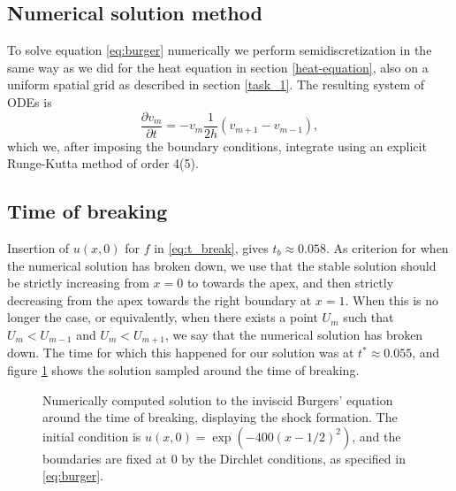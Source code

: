 \subsection*{Numerical solution method}
To solve equation \eqref{eq:burger} numerically we perform semidiscretization in the same way as we did for the heat equation in section \ref{heat-equation}, 
also on a uniform spatial grid as described in section \ref{task_1}. 
The resulting system of ODEs is
\begin{equation*}
    \frac{\partial v_m}{\partial t} = -v_m \frac{1}{2h} (v_{m+1} - v_{m-1}), 
\end{equation*}
which we, after imposing the boundary conditions, 
integrate using an explicit Runge-Kutta method of order 4(5). 

%    

\subsection{Time of breaking}
Insertion of $u(x, 0)$ for $f$ in \eqref{eq:t_break}, 
gives $t_b \approx 0.058$. 
As criterion for when the numerical solution has broken down, 
we use that the stable solution should be strictly increasing from $x=0$ to towards the apex, 
and then strictly decreasing from the apex towards the right boundary at $x=1$. 
When this is no longer the case, 
or equivalently, 
when there exists a point $U_m$ such that $U_m < U_{m-1}$ and $U_m < U_{m+1}$, 
we say that the numerical solution has broken down. 
The time for which this happened for our solution was at $t^* \approx 0.055$, 
and figure \ref{fig:burgers-samples} shows the solution sampled around the time of breaking. 

\begin{figure}[ht]
    \centering
    
    \caption{
        Numerically computed solution to the inviscid Burgers' equation around the time of breaking, 
        displaying the shock formation. 
        The initial condition is $u\left(x, 0\right) = \exp\left(-400(x-1/2)^2\right)$, 
        and the boundaries are fixed at $0$ by the Dirchlet conditions, 
        as specified in \eqref{eq:burger}. 
    }
    \label{fig:burgers-samples}
\end{figure}

